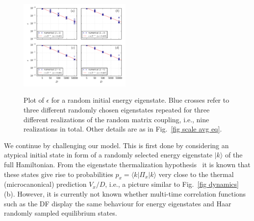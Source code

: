\documentclass[pre,twocolumn,10pt,aps,longbibliography,nofootinbib]{revtex4-1}
\newcommand{\lr}[1]{{\langle {#1}\rangle}}
\begin{document}
\begin{figure}[t]
 \centering\includegraphics[width=0.49\textwidth,clip=true]{eps_001_eig.pdf}
 \label{fig scale avg eig}\vspace{-0.5cm}
 \caption{Plot of $\epsilon$ for a random initial energy eigenstate. Blue crosses refer to three different randomly chosen eigenstates repeated for three different realizations of the random matrix coupling, i.e., nine realizations in total. Other details are as in Fig.~\ref{fig scale avg eq}. }
\end{figure}

We continue by challenging our model. This is first done by considering an atypical initial state in form of a
randomly selected energy eigenstate $|k\rangle$ of the full Hamiltonian. From the eigenstate thermalization
hypothesis~\cite{DeutschPRA1991, SrednickiPRE1994, SrednickiJPA1999, DAlessioEtAlAP2016, DeutschRPP2018,
ReimannDabelowPRE2021} it is known that these states give rise to probabilities $p_x = \lr{k|\Pi_x|k}$ very close to
the thermal (microcanonical) prediction $V_x/D$, i.e., a picture similar to Fig.~\ref{fig dynamics} (b). However,
it is currently not known whether multi-time correlation functions such as the DF display the same behaviour for 
energy eigenstates and Haar randomly sampled equilibrium states.
\end{document}
